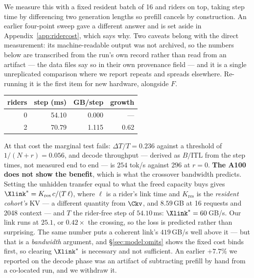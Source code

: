 We measure this with a fixed resident batch of 16 and riders on top, taking step time
by differencing two generation lengths so prefill cancels by construction. An earlier
four-point sweep gave a different answer and is set aside in
Appendix~\ref{app:ridercost}, which says why. Two caveats belong with the direct
measurement: its machine-readable output was not archived, so the numbers below are
transcribed from the run's own record rather than read from an artifact --- the data
files say so in their own provenance field --- and it is a single unreplicated
comparison where we report repeats and spreads elsewhere. Re-running it is the first
item for new hardware, alongside $F$.
%
\begin{center}\small
\begin{tabular}{rrrr}
\toprule
riders & step (ms) & GB/step & growth \\
\midrule
0 & 54.10 & 0.000 & --- \\
2 & 70.79 & 1.115 & 0.62 \\
\bottomrule
\end{tabular}
\end{center}
%
At that cost the marginal test fails: $\Delta T/T = 0.236$ against a threshold
of $1/(N{+}r) = 0.056$, and decode throughput --- derived as $B/\mathrm{ITL}$
from the step times, not measured end to end --- is $254$ tok/s against $296$ at
$r{=}0$. \textbf{The A100 does not show the benefit}, which is what
the crossover bandwidth predicts. Setting the unhidden transfer equal to what
the freed capacity buys gives $\Xlink^{*} = K_{\mathrm{res}}\,c/(T\,\ell)$, where $\ell$ is a
rider's link time and $K_{\mathrm{res}}$ is the
\emph{resident cohort's} KV --- a different quantity from $\Ckv$, and
$8.59$\,GB at 16 requests and 2048 context ---
and $T$ the rider-free step of $54.10$\,ms: $\Xlink^{*} = 60$\,GB/s. Our link
runs at $25.1$, or $0.42\times$ the crossing, so the loss is predicted rather
than surprising. The same number puts a coherent link's $419$\,GB/s well above
it --- but that is a \emph{bandwidth} argument, and
\S\ref{sec:model:omits} shows the fixed cost binds first, so clearing
$\Xlink^{*}$ is necessary and not sufficient. An earlier
$+7.7\%$ we reported on the decode phase was an artifact of subtracting prefill
by hand from a co-located run, and we withdraw it.

